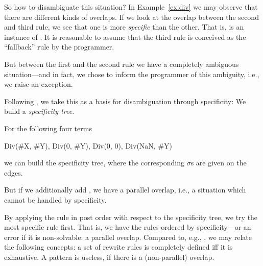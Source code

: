 So how to disambiguate this situation? In Example~\ref{ex:div} we may
observe that there are different kinds of overlaps.
%
If we look at the overlap between the second and third rule, we see
that one is more \emph{specific} than the other. That is,
 is an instance of
. It is reasonable to assume that the
third rule is conceived as the ``fallback'' rule by the programmer.

But between the first and the second rule we have a completely
ambiguous situation---and in fact, we chose to inform the programmer
of this ambiguity, i.e., we raise an exception.

Following \cite{1990_kennaway}, we take this as a basis for
disambiguation through specificity: We build a
\emph{specificity tree}.
%
\begin{example} 
For the following four terms
\begin{lstTosca}
  Div(#X, #Y), Div(0, #Y), Div(0, 0), Div(NaN, #Y)
\end{lstTosca}  
we can build the specificity tree, where the corresponding $\sigma$s are
given on the edges.
\begin{center}	  
\end{center} 
%
But if we additionally add , we have a
parallel overlap, i.e., a situation which cannot be handled by
specificity. 
%
\end{example}
%
By applying the rule in post order with respect to the specificity
tree, we try the most specific rule first. That is, we have the rules
ordered by specificity---or an error if it is non-solvable: a parallel
overlap.  Compared to, e.g., \cite{2007_maranget}, we may relate the
following concepts: a set of rewrite rules is completely defined iff
it is exhaustive. A pattern is useless, if there is a (non-parallel)
overlap.

